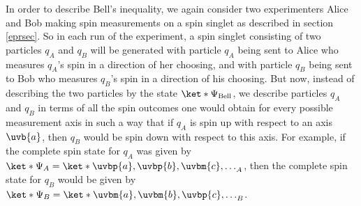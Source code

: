 \documentclass[12pt]{report}
\providecommand{\DIFadd}[1]{{\protect\color{blue}\uwave{#1}}} %
\providecommand{\DIFdel}[1]{{\protect\color{red}\sout{#1}}}                      %
\providecommand{\DIFaddbegin}{} %
\providecommand{\DIFaddend}{} %
\providecommand{\DIFdelbegin}{} %
\providecommand{\DIFdelend}{} %
\begin{document}
In order to describe Bell's inequality, we again consider two experimenters Alice and Bob making spin measurements on a spin singlet as described in section \ref{eprsec}. So in each run of the experiment, a spin singlet consisting of two particles $q_A$ and $q_B$ will be generated with particle $q_A$ being sent to Alice who measures $q_A$'s spin in a direction of her choosing, and with particle $q_B$ being sent to Bob who measures $q_B$'s spin in a direction of his choosing.  But now, instead of describing the two particles by the state $\ket*{\Psi_{\text{Bell}}}$, we describe particles $q_A$ and $q_B$ in terms of all the spin outcomes one would obtain for every possible measurement axis in such a way that if $q_A$ is spin up with respect to an axis $\uvb{a}$, then $q_B$ would be spin down with respect to this axis. For example, if the complete spin state for $q_A$ was given by \DIFdelbegin \DIFdel{$\ket*{\Psi_A}=\ket*{\uvbp{a},\uvbp{b},\uvbm{c},\ldots}_A$}\DIFdelend \DIFaddbegin \DIFadd{$\ket*{\Psi_A}=\ket*{\uvbp{a};\uvbp{b};\uvbm{c};\ldots}_A$}\DIFaddend , then the complete spin state for $q_B$ would be given by \DIFdelbegin \DIFdel{$\ket*{\Psi_B}=\ket*{\uvbm{a},\uvbm{b},\uvbp{c},\ldots}_B$}\DIFdelend \DIFaddbegin \DIFadd{$\ket*{\Psi_B}=\ket*{\uvbm{a};\uvbm{b};\uvbp{c};\ldots}_B$}\DIFaddend .
\end{document}
